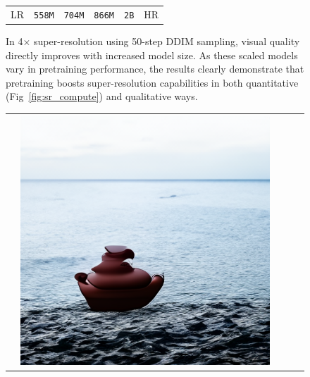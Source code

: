 \begin{figure}[!ht]
\begin{tabular}[t]{c c c c c c}
    \\[-0.2em]
    \scriptsize LR &  \scriptsize \texttt{558M} & \scriptsize \texttt{704M} & \scriptsize \texttt{866M} & \scriptsize \texttt{2B} & \scriptsize HR
    \end{tabular}
    \caption{In 4$\times$ super-resolution using 50-step DDIM sampling, visual quality directly improves with increased model size. As these scaled models vary in pretraining performance, the results clearly demonstrate that pretraining boosts super-resolution capabilities in both quantitative (Fig~\ref{fig:sr_compute}) and qualitative ways.
    }
    \label{fig:sr}
\end{figure}

\begin{figure}[!ht]
\scriptsize
    \centering
    \def\xwidth{0.135\linewidth}
    \setlength{\tabcolsep}{1pt}
    \begin{tabular}[t]{c c c c c}
    &
    \includegraphics[width=\xwidth]{cp2/figures/dreambooth/teapot/c96_checkpoint_599.png} &

\end{tabular}
\end{figure}
